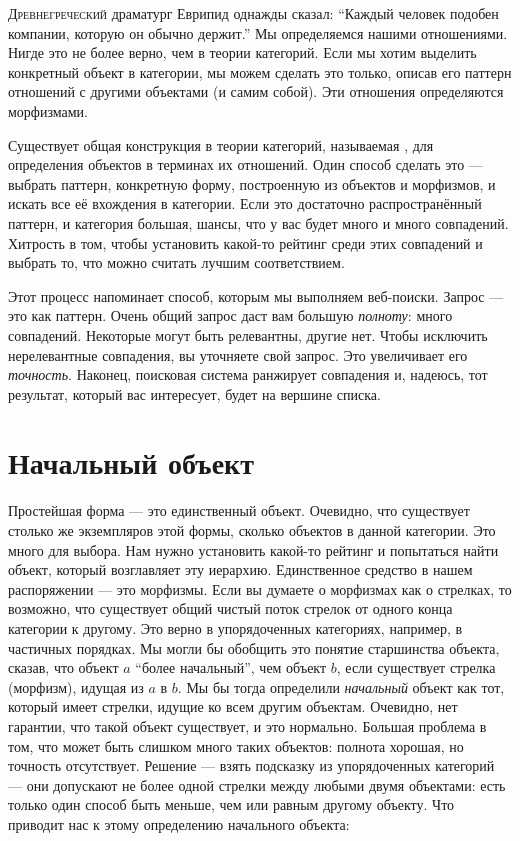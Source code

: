 
\lettrine[lhang=0.17]{Д}{ревнегреческий} драматург Еврипид однажды сказал: ``Каждый человек подобен
компании, которую он обычно держит.'' Мы определяемся нашими отношениями.
Нигде это не более верно, чем в теории категорий. Если мы хотим выделить
конкретный объект в категории, мы можем сделать это только, описав
его паттерн отношений с другими объектами (и самим собой). Эти
отношения определяются морфизмами.

Существует общая конструкция в теории категорий, называемая
, для определения объектов в терминах их
отношений. Один способ сделать это --- выбрать паттерн, конкретную
форму, построенную из объектов и морфизмов, и искать все её
вхождения в категории. Если это достаточно распространённый паттерн, и
категория большая, шансы, что у вас будет много и много совпадений. 
Хитрость в том, чтобы установить какой-то рейтинг среди этих совпадений и выбрать
то, что можно считать лучшим соответствием.

Этот процесс напоминает способ, которым мы выполняем веб-поиски. Запрос ---
это как паттерн. Очень общий запрос даст вам большую \emph{полноту}:
много совпадений. Некоторые могут быть релевантны, другие нет. Чтобы исключить нерелевантные
совпадения, вы уточняете свой запрос. Это увеличивает его \emph{точность}.
Наконец, поисковая система ранжирует совпадения и, надеюсь, тот
результат, который вас интересует, будет на вершине списка.

\section{Начальный объект}

Простейшая форма --- это единственный объект. Очевидно, что существует столько же
экземпляров этой формы, сколько объектов в данной категории. Это
много для выбора. Нам нужно установить какой-то рейтинг и попытаться
найти объект, который возглавляет эту иерархию. Единственное средство в нашем
распоряжении --- это морфизмы. Если вы думаете о морфизмах как о стрелках, то возможно,
что существует общий чистый поток стрелок от одного конца
категории к другому. Это верно в упорядоченных категориях, например, в
частичных порядках. Мы могли бы обобщить это понятие старшинства объекта,
сказав, что объект $a$ ``более начальный'', чем объект $b$, если
существует стрелка (морфизм), идущая из $a$ в $b$. Мы бы тогда
определили \emph{начальный} объект как тот, который имеет стрелки, идущие ко
всем другим объектам. Очевидно, нет гарантии, что такой объект
существует, и это нормально. Большая проблема в том, что может быть слишком много
таких объектов: полнота хорошая, но точность отсутствует. Решение ---
взять подсказку из упорядоченных категорий --- они допускают не более одной
стрелки между любыми двумя объектами: есть только один способ быть меньше, чем
или равным другому объекту. Что приводит нас к этому определению
начального объекта:

